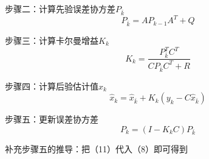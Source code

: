 \documentclass[UTF8,a4paper,10pt]{ctexart}
\begin{document}
    步骤二：计算先验误差协方差$P_{\bar{k}}$
    \begin{equation}
        P_{\bar{k}} = AP_{k-1}A^T + Q
    \end{equation}

    步骤三：计算卡尔曼增益$K_k$
    \begin{equation}
        K_k = \frac{P^T_{\bar{k}}C^T}{CP_{\bar{k}}C^T+ R}
    \end{equation}

    步骤四：计算后验估计值$\hat{x}_k$
    \begin{equation}
        \hat{x}_{k} = \hat{x}_{\bar{k}} + K_k(y_k- C\hat{x}_{\bar{k}})
    \end{equation}

    步骤五：更新误差协方差
    \begin{equation}
        P_k = (I - K_kC)P_{\bar{k}}
    \end{equation}
    
    补充步骤五的推导：把（11）代入（8）即可得到
\end{document}

